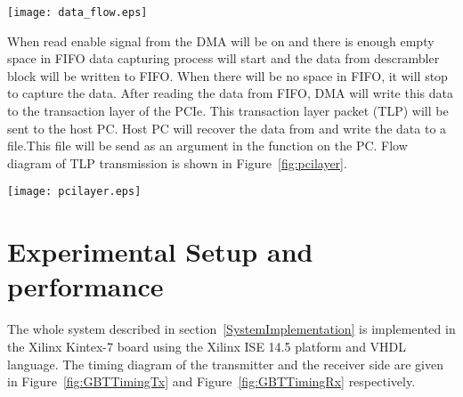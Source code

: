 \documentclass[10pt, conference, compsocconf]{IEEEtran}
\begin{document}
\begin{figure*}[htb]
\centering
\texttt{[image: data\_flow.eps]}
\caption{Internal data flow diagram of the proposed system }
\label{fig:data_flow}
\end{figure*}
\par
When read enable signal from the DMA will be on and there is enough empty space in FIFO data capturing process will start and the data from descrambler block will be written to FIFO. When there will be no space in FIFO, it will stop to capture the data. After reading the data from FIFO, DMA will write this data to the transaction layer of the PCIe. This transaction layer packet (TLP) will be sent to the host PC. Host PC will recover the data from  and write the data to a file.This file will be send as an argument in the  function on the PC. Flow diagram of TLP transmission is shown in Figure~\ref{fig:pcilayer}. 
\begin{figure*}[h]
\centering
\texttt{[image: pcilayer.eps]}
\vspace*{-8pt}
\caption{Structure of PCIe layers}
\label{fig:pcilayer}
\end{figure*}





\section{Experimental Setup and performance} \label{PerformenceEvoluation}
The whole system described in section~\ref{SystemImplementation} is implemented in the Xilinx Kintex-7 board using the Xilinx ISE 14.5 platform and VHDL language.  The timing diagram of the transmitter and the receiver side are given in Figure~\ref{fig:GBTTimingTx} and Figure~\ref{fig:GBTTimingRx} respectively.
\end{document}
